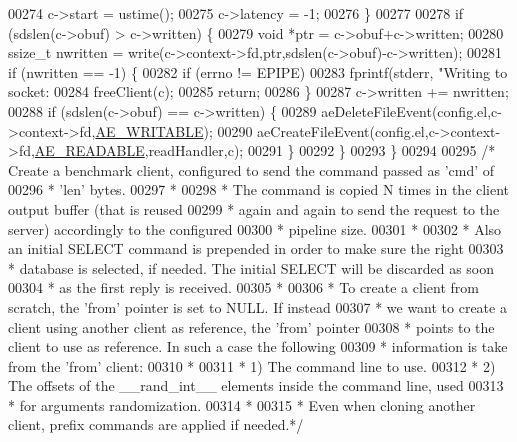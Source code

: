 \begin{DoxyCode}
{{{00274         c->start = ustime();
00275         c->latency = -1;
00276     \}
00277 
00278     \textcolor{keywordflow}{if} (sdslen(c->obuf) > c->written) \{
00279         \textcolor{keywordtype}{void} *ptr = c->obuf+c->written;
00280         ssize\_t nwritten = write(c->context->fd,ptr,sdslen(c->obuf)-c->written);
00281         \textcolor{keywordflow}{if} (nwritten == -1) \{
00282             \textcolor{keywordflow}{if} (errno != EPIPE)
00283                 fprintf(stderr, \textcolor{stringliteral}{"Writing to socket: %
00284             freeClient(c);
00285             \textcolor{keywordflow}{return};
00286         \}
00287         c->written += nwritten;
00288         \textcolor{keywordflow}{if} (sdslen(c->obuf) == c->written) \{
00289             aeDeleteFileEvent(config.el,c->context->fd,\hyperlink{ae_8h_ab6bfb0366ccb6277112d132c2a2bf500}{AE\_WRITABLE});
00290             aeCreateFileEvent(config.el,c->context->fd,\hyperlink{ae_8h_a7a9a2162d007d09739955b4e55c65bf3}{AE\_READABLE},readHandler,c);
00291         \}
00292     \}
00293 \}
00294 
00295 \textcolor{comment}{/* Create a benchmark client, configured to send the command passed as 'cmd' of}
00296 \textcolor{comment}{ * 'len' bytes.}
00297 \textcolor{comment}{ *}
00298 \textcolor{comment}{ * The command is copied N times in the client output buffer (that is reused}
00299 \textcolor{comment}{ * again and again to send the request to the server) accordingly to the configured}
00300 \textcolor{comment}{ * pipeline size.}
00301 \textcolor{comment}{ *}
00302 \textcolor{comment}{ * Also an initial SELECT command is prepended in order to make sure the right}
00303 \textcolor{comment}{ * database is selected, if needed. The initial SELECT will be discarded as soon}
00304 \textcolor{comment}{ * as the first reply is received.}
00305 \textcolor{comment}{ *}
00306 \textcolor{comment}{ * To create a client from scratch, the 'from' pointer is set to NULL. If instead}
00307 \textcolor{comment}{ * we want to create a client using another client as reference, the 'from' pointer}
00308 \textcolor{comment}{ * points to the client to use as reference. In such a case the following}
00309 \textcolor{comment}{ * information is take from the 'from' client:}
00310 \textcolor{comment}{ *}
00311 \textcolor{comment}{ * 1) The command line to use.}
00312 \textcolor{comment}{ * 2) The offsets of the \_\_rand\_int\_\_ elements inside the command line, used}
00313 \textcolor{comment}{ *    for arguments randomization.}
00314 \textcolor{comment}{ *}
00315 \textcolor{comment}{ * Even when cloning another client, prefix commands are applied if needed.*/}
}}}}
\end{DoxyCode}
